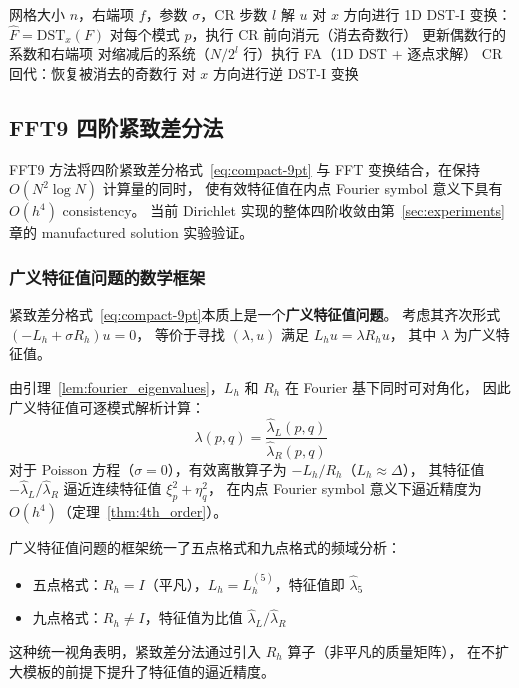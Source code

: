 \begin{algorithm}
\caption{FACR(l) 混合算法}
\begin{algorithmic}[1]
\REQUIRE 网格大小 $n$，右端项 $f$，参数 $\sigma$，CR 步数 $l$
\ENSURE 解 $u$
\STATE 对 $x$ 方向进行 1D DST-I 变换：$\hat{F} = \mathrm{DST}_x(F)$
  \STATE 对每个模式 $p$，执行 CR 前向消元（消去奇数行）
  \STATE 更新偶数行的系数和右端项
\ENDFOR
\STATE 对缩减后的系统（$N/2^l$ 行）执行 FA（1D DST + 逐点求解）
  \STATE CR 回代：恢复被消去的奇数行
\ENDFOR
\STATE 对 $x$ 方向进行逆 DST-I 变换
\end{algorithmic}
\end{algorithm}

\subsection{FFT9 四阶紧致差分法}

FFT9 方法将四阶紧致差分格式~\eqref{eq:compact-9pt}
与 FFT 变换结合，在保持 $O(N^2 \log N)$ 计算量的同时，
使有效特征值在内点 Fourier symbol 意义下具有 $O(h^4)$ consistency。
当前 Dirichlet 实现的整体四阶收敛由第~\ref{sec:experiments}章的 manufactured solution 实验验证。

\subsubsection{广义特征值问题的数学框架}

紧致差分格式~\eqref{eq:compact-9pt}本质上是一个\textbf{广义特征值问题}。
考虑其齐次形式 $(-L_h + \sigma R_h)u = 0$，
等价于寻找 $(\lambda, u)$ 满足 $L_h u = \lambda R_h u$，
其中 $\lambda$ 为广义特征值。

由引理~\ref{lem:fourier_eigenvalues}，$L_h$ 和 $R_h$ 在 Fourier 基下同时可对角化，
因此广义特征值可逐模式解析计算：
\begin{equation}
  \lambda(p,q) = \frac{\hat{\lambda}_L(p,q)}{\hat{\lambda}_R(p,q)}
  \label{eq:gen_eigenvalue}
\end{equation}
对于 Poisson 方程（$\sigma = 0$），有效离散算子为 $-L_h/R_h$（$L_h \approx \Delta$），
其特征值 $-\hat{\lambda}_L/\hat{\lambda}_R$ 逼近连续特征值 $\xi_p^2 + \eta_q^2$，
在内点 Fourier symbol 意义下逼近精度为 $O(h^4)$（定理~\ref{thm:4th_order}）。

广义特征值问题的框架统一了五点格式和九点格式的频域分析：
\begin{itemize}[itemsep=2pt]
  \item 五点格式：$R_h = I$（平凡），$L_h = L_h^{(5)}$，特征值即 $\hat{\lambda}_5$
  \item 九点格式：$R_h \neq I$，特征值为比值 $\hat{\lambda}_L/\hat{\lambda}_R$
\end{itemize}
这种统一视角表明，紧致差分法通过引入 $R_h$ 算子（非平凡的质量矩阵），
在不扩大模板的前提下提升了特征值的逼近精度。

